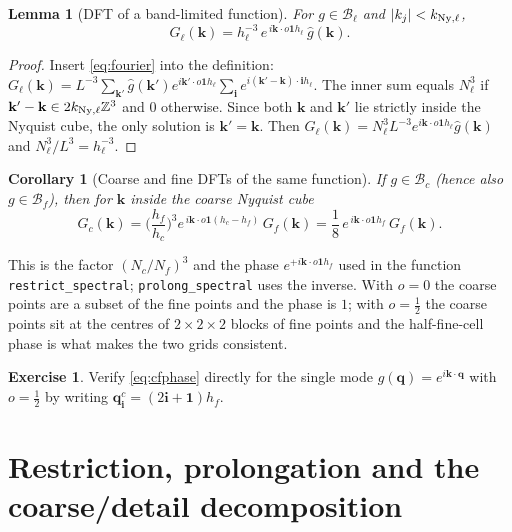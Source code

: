 \documentclass[11pt]{article}
\newtheorem{lemma}[proposition]{Lemma}
\newtheorem{corollary}[proposition]{Corollary}
\theoremstyle{definition}
\newtheorem{exercise}[proposition]{Exercise}
\newcommand{\q}{\mathbf{q}}
\newcommand{\kk}{\mathbf{k}}
\newcommand{\Bf}{\mathcal{B}_f}
\newcommand{\Z}{\mathbb{Z}}
\newcommand{\Ny}{{\rm Ny}}
\begin{document}
\begin{lemma}[DFT of a band-limited function]\label{lem:dft}
For $g\in\mathcal B_\ell$ and $|k_j|<k_{\Ny,\ell}$,
\begin{equation}
G_\ell(\kk)=h_\ell^{-3}\,e^{\,i\kk\cdot o\mathbf 1 h_\ell}\,\hat g(\kk).
\label{eq:dft}
\end{equation}
\end{lemma}
\begin{proof}
Insert \eqref{eq:fourier} into the definition:
$G_\ell(\kk)=L^{-3}\sum_{\kk'}\hat g(\kk')e^{i\kk'\cdot o\mathbf 1h_\ell}\sum_{\mathbf i}e^{i(\kk'-\kk)\cdot\mathbf i h_\ell}$. The inner sum equals $N_\ell^3$ if $\kk'-\kk\in 2k_{\Ny,\ell}\Z^3$ and $0$ otherwise. Since both $\kk$ and $\kk'$ lie strictly inside the Nyquist cube, the only solution is $\kk'=\kk$. Then $G_\ell(\kk)=N_\ell^3L^{-3}e^{i\kk\cdot o\mathbf 1h_\ell}\hat g(\kk)$ and $N_\ell^3/L^3=h_\ell^{-3}$.
\end{proof}

\begin{corollary}[Coarse and fine DFTs of the same function]\label{cor:cf}
If $g\in\mathcal B_c$ (hence also $g\in\Bf$), then for $\kk$ inside the coarse Nyquist cube
\begin{equation}
G_c(\kk)=\Big(\frac{h_f}{h_c}\Big)^{3}e^{\,i\kk\cdot o\mathbf 1(h_c-h_f)}\,G_f(\kk)=\frac18\,e^{\,i\kk\cdot o\mathbf 1 h_f}\,G_f(\kk).
\label{eq:cfphase}
\end{equation}
\end{corollary}
This is the factor $(N_c/N_f)^3$ and the phase $e^{+i\kk\cdot o\mathbf 1h_f}$ used in the function \texttt{restrict\_spectral}; \texttt{prolong\_spectral} uses the inverse. With $o=0$ the coarse points are a subset of the fine points and the phase is $1$; with $o=\tfrac12$ the coarse points sit at the centres of $2\times2\times2$ blocks of fine points and the half-fine-cell phase is what makes the two grids consistent.

\begin{exercise}
Verify \eqref{eq:cfphase} directly for the single mode $g(\q)=e^{i\kk\cdot\q}$ with $o=\tfrac12$ by writing $\q^{c}_{\mathbf i}=(2\mathbf i+\mathbf 1)h_f$.
\end{exercise}

\section{Restriction, prolongation and the coarse/detail decomposition}
\end{document}
